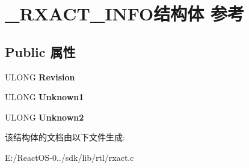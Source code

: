 \hypertarget{struct___r_x_a_c_t___i_n_f_o}{}\section{\+\_\+\+R\+X\+A\+C\+T\+\_\+\+I\+N\+F\+O结构体 参考}
\label{struct___r_x_a_c_t___i_n_f_o}
\subsection*{Public 属性}
\begin{DoxyCompactItemize}
\item 
\mbox{\label{struct___r_x_a_c_t___i_n_f_o_a4675f4ba85d504d6059f20e5961d5207}} 
U\+L\+O\+NG {\bfseries Revision}
\item 
\mbox{\label{struct___r_x_a_c_t___i_n_f_o_a8534f375f9da76fb2d38e953ccb66413}} 
U\+L\+O\+NG {\bfseries Unknown1}
\item 
\mbox{\label{struct___r_x_a_c_t___i_n_f_o_a96c553278103a126035b69f012562369}} 
U\+L\+O\+NG {\bfseries Unknown2}
\end{DoxyCompactItemize}


该结构体的文档由以下文件生成\+:\begin{DoxyCompactItemize}
\item 
E\+:/\+React\+O\+S-\/0../sdk/lib/rtl/rxact.\+c\end{DoxyCompactItemize}
